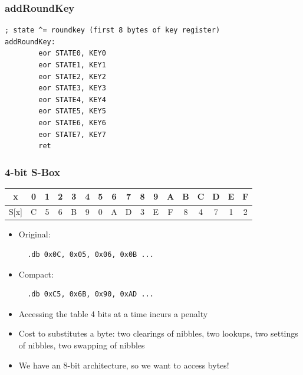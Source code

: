 \documentclass{beamer}
\begin{document}
\begin{frame}[fragile]
\frametitle{addRoundKey}
\begin{lstlisting}
; state ^= roundkey (first 8 bytes of key register)
addRoundKey:
        eor STATE0, KEY0
        eor STATE1, KEY1
        eor STATE2, KEY2
        eor STATE3, KEY3
        eor STATE4, KEY4
        eor STATE5, KEY5
        eor STATE6, KEY6
        eor STATE7, KEY7
        ret
\end{lstlisting}
\end{frame}

\begin{frame}[fragile]
\frametitle{4-bit S-Box}
	\begin{tabular}{ | c | c | c | c | c | c | c | c | c | c | c | c | c | c | c | c | c | }
	  \hline                        
	     x & 0 & 1 & 2 & 3 & 4 & 5 & 6 & 7 & 8 & 9 & A & B & C & D & E & F \\
	  \hline                        
	  S[x] & C & 5 & 6 & B & 9 & 0 & A & D & 3 & E & F & 8 & 4 & 7 & 1 & 2 \\
	  \hline  
	\end{tabular}

\begin{itemize}
\item Original:
  \begin{lstlisting}
  .db 0x0C, 0x05, 0x06, 0x0B ...
  \end{lstlisting}
\item Compact:
  \begin{lstlisting}
  .db 0xC5, 0x6B, 0x90, 0xAD ...
  \end{lstlisting}
\item Accessing the table 4 bits at a time incurs a penalty
\item Cost to substitutes a byte: two clearings of nibbles, two lookups, two settings of nibbles, two swapping of nibbles
\item We have an 8-bit architecture, so we want to access bytes!
\end{itemize}
\end{frame}
\end{document}
